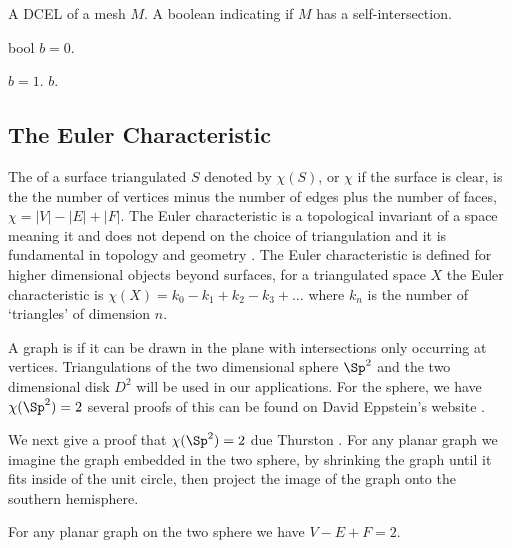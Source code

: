 \begin{algorithm}
 \caption{Self-intersection}\label{alg:self-intersection}
    \begin{algorithmic}[1]
      \Require A DCEL of a mesh $M.$
        \Ensure A boolean indicating if $M$ has a self-intersection.
        
        \State bool $b=0.$
	
		\State $b=1.$
	\EndIf 
	\EndFor
\EndFor
\Return $b$.
\end{algorithmic}
\end{algorithm}



\subsection{The Euler Characteristic}

The  of a surface triangulated $S$ denoted by $\chi(S)$, or $\chi$
 if the surface is clear,  is the 
the number of vertices minus the number of edges plus  the number of faces, $\chi=|V|-|E|+|F|.$
The Euler characteristic is a topological invariant of a space meaning it
and does not depend on the choice of triangulation and it is fundamental in topology
and geometry \cite{chern_triangles_1979}.
The Euler characteristic is defined for higher dimensional objects beyond surfaces,
 for a triangulated space $X$ the Euler characteristic is 
$\chi(X)=k_0-k_1+k_2-k_3+\ldots$ where $k_n$ is the number of `triangles' of dimension $n.$



A  graph  is  if it can be drawn in the plane with intersections only occurring
at vertices.
Triangulations of the two dimensional sphere $\Sp^2$ and the two dimensional disk $D^2$ 
will be used in our applications.
For the sphere, we have $\chi(\Sp^2)=2$ 
several proofs of this can be found on David Eppstein's website \cite{eppstein-proofs}.




We next give a proof that $\chi(\Sp^2)=2$ due Thurston \cite{thurston}. 
For any planar graph we imagine the graph embedded in the two sphere, by
shrinking the graph until it fits inside of the unit circle, then project the image of the graph
onto the southern hemisphere.  

\begin{theorem}\label{thm:euler}
For any planar graph on the two sphere we have $V-E+F=2.$
\end{theorem}

